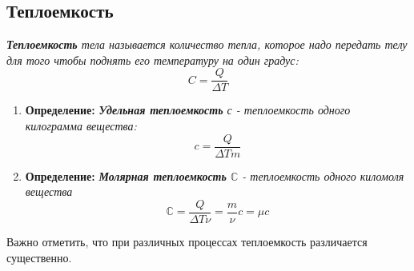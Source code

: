 \documentclass[../main.tex]{subfiles}
\begin{document}
\subsection{Теплоемкость}
 \textit{\textbf{Теплоемкость} тела называется количество тепла, которое надо передать телу для того чтобы поднять его температуру на один градус: \[ C = \frac{Q}{\Delta T} \] }
\begin{enumerate}
    \item \textbf{Определение:} \textit{\textbf{Удельная теплоемкость }с - теплоемкость одного килограмма вещества: \[ c = \frac{Q}{\Delta T m}\]}
    \item \textbf{Определение:} \textit{\textbf{Молярная теплоемкость }$\mathbb{C}$ - теплоемкость одного киломоля вещества }
          \[ \mathbb{C} = \frac{Q}{\Delta T \nu} = \frac{m}{\nu}c = \mu c\]
\end{enumerate}
Важно отметить, что при различных процессах теплоемкость различается существенно.
\end{document}
